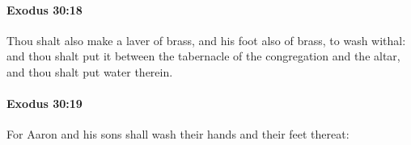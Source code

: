 		\paragraph{Exodus 30:18} %
			\label{EXODUS-30-18}

			Thou shalt also make a laver of brass, and his foot also of brass, to wash withal: and thou shalt put it between the tabernacle of the congregation and the altar, and thou shalt put water therein.


		\paragraph{Exodus 30:19} %
			\label{EXODUS-30-19}

			For Aaron and his sons shall wash their hands and their feet thereat:


